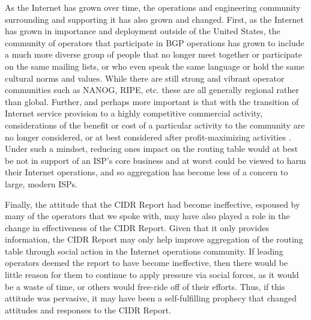 As the Internet has grown over time, the operations and engineering community
surrounding and supporting it has also grown and changed. First, as the
Internet has grown in importance and deployment outside of the United States,
the community of operators that participate in BGP operations has grown to
include a much more diverse group of people that no longer meet together or
participate on the same mailing lists, or who even speak the same language or
hold the same cultural norms and values. While there are still strong and
vibrant operator communities such as NANOG, RIPE, etc. these are all generally
regional rather than global. Further, and perhaps more important is that with
the transition of Internet service provision to a highly competitive commercial
activity, considerations of the benefit or cost of a particular activity to the
community are no longer considered, or at best considered after
profit-maximizing activities \cite{Li:2011vn}. Under such a mindset, reducing
ones impact on the routing table would at best be not in support of an ISP's
core business and at worst could be viewed to harm their Internet operations,
and so aggregation has become less of a concern to large, modern ISPs.


Finally, the attitude that the CIDR Report had become ineffective, espoused by
many of the operators that we spoke with, may have also played a role in the
change in effectiveness of the CIDR Report. Given that it only provides
information, the CIDR Report may only help improve aggregation of the routing
table through social action in the Internet operations community. If leading
operators deemed the report to have become ineffective, then there would be
little reason for them to continue to apply pressure via social forces, as it
would be a waste of time, or others would free-ride off of their efforts. Thus,
if this attitude was pervasive, it may have been a self-fulfilling prophecy
that changed attitudes and responses to the CIDR Report.



